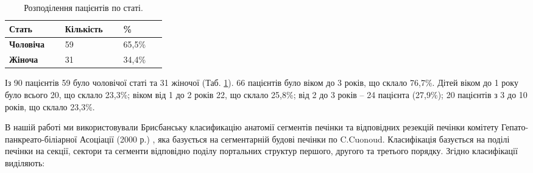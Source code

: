 \begin{table}[]
\centering
\caption{Розподілення пацієнтів по статі.}
\label{tab:sex}
\begin{tabular}{|p{0.1\linewidth}|p{0.1\linewidth}|p{0.1\linewidth}|}
\hline
\textbf{Стать}    & {\color[HTML]{231F20} \textbf{Кількість}} & {\color[HTML]{231F20} \textbf{\%}} \\ \hline
\textbf{Чоловіча} & 59                                        & 65,5\%                            \\ \hline
\textbf{Жіноча}   & 31                                        & 34,4\%                            \\ \hline
\end{tabular}
\end{table}

Із 90 пацієнтів 59 було чоловічої статі та 31 жіночої (Таб. \ref{tab:sex}). 66 пацієнтів було віком до 3 років, що склало 76,7\%. Дітей віком до 1 року було всього 20, що склало 23,3\%; віком від 1 до 2 років 22, що склало 25,8\%; від 2 до 3 років – 24 пацієнта (27,9\%); 20 пацієнтів з 3 до 10 років, що склало 23,3\%.

В нашій работі ми використовували Брисбанську класификацію анатомії сегментів печінки та відповідних резекцій печінки комітету Гепато-панкреато-біліарної Асоціації (2000 р.) \cite{pmid24852330}, яка базується на сегментарній будові печінки по C.Cuonoud. Класифікація базується на поділі печінки на секції, сектори та сегменти відповідно поділу портальних структур першого, другого та третього порядку. Згідно класифікації виділяють: 

